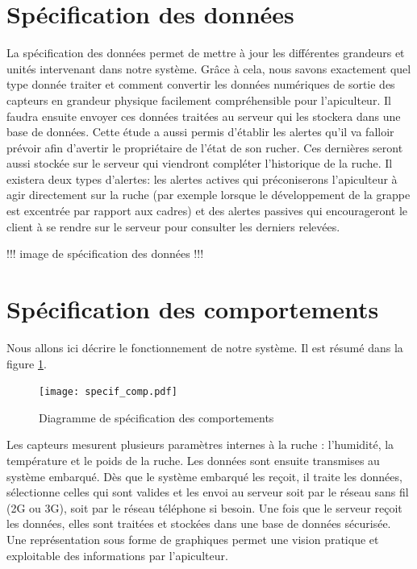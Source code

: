 \clearpage

\section{Spécification des données}
La spécification des données permet de mettre à jour les différentes grandeurs 
et unités intervenant dans notre système. Grâce à cela, nous savons exactement 
quel type donnée traiter et comment convertir les données numériques de sortie des capteurs en grandeur physique facilement compréhensible pour l'apiculteur. Il faudra ensuite envoyer ces données traitées au serveur qui les stockera dans une base de données. Cette étude a aussi permis d'établir les alertes qu'il va falloir prévoir afin d'avertir le propriétaire de l'état de son rucher. Ces dernières seront aussi stockée sur le serveur qui viendront compléter l'historique de la ruche. Il existera deux types d'alertes: les alertes actives qui préconiserons l'apiculteur à agir directement sur la ruche (par exemple lorsque le développement de la grappe est excentrée par rapport aux cadres) et des alertes passives qui encourageront le client à se rendre sur le serveur pour consulter les derniers relevées.    

!!!  image de spécification des données  !!!

\clearpage

\section{Spécification des comportements}

Nous allons ici décrire le fonctionnement de notre système. Il est résumé dans la figure \ref{fig:sp_comp}.

\begin{figure}[h!]
\centering\texttt{[image: specif\_comp.pdf]}
\caption{\label{fig:sp_comp} Diagramme de spécification des comportements}
\end{figure}

Les capteurs mesurent plusieurs paramètres internes à la ruche : l'humidité, la température et le poids de la ruche. Les données sont ensuite transmises au système embarqué. Dès que le système embarqué les reçoit, il traite les données, sélectionne celles qui sont valides et les envoi au serveur soit par le réseau sans fil (2G ou 3G), soit par le réseau téléphone si besoin. Une fois que le serveur reçoit les données, elles sont traitées et stockées dans une base de données sécurisée. Une représentation sous forme de graphiques permet une vision pratique et exploitable des informations par l'apiculteur.

